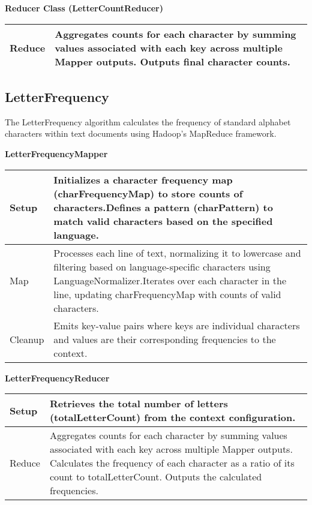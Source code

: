 \textbf{Reducer Class (LetterCountReducer)}
\begin{longtable}{|>{\raggedright\arraybackslash}p{}|>{\raggedright\arraybackslash}p{}|}
    \hline
    Reduce & Aggregates counts for each character by summing values associated with each key across multiple Mapper outputs. Outputs final character counts. \\
    \hline
\end{longtable}






\subsection{LetterFrequency}
The LetterFrequency algorithm calculates the frequency of standard alphabet characters within text documents using Hadoop's MapReduce framework.


\textbf{LetterFrequencyMapper}
\begin{longtable}{|>{\raggedright\arraybackslash}p{}|>{\raggedright\arraybackslash}p{}|}
    \hline
    Setup & Initializes a character frequency map (charFrequencyMap) to store counts of characters.Defines a pattern (charPattern) to match valid characters based on the specified language. \\
    \hline
    Map & Processes each line of text, normalizing it to lowercase and filtering based on language-specific characters using LanguageNormalizer.Iterates over each character in the line, updating charFrequencyMap with counts of valid characters.\\
    \hline
    Cleanup & Emits key-value pairs where keys are individual characters and values are their corresponding frequencies to the context.
    \\
    \hline
\end{longtable}


\textbf{LetterFrequencyReducer}
\begin{longtable}{|>{\raggedright\arraybackslash}p{}|>{\raggedright\arraybackslash}p{}|}
    \hline
    Setup & Retrieves the total number of letters (totalLetterCount) from the context configuration. \\
    \hline
    Reduce & Aggregates counts for each character by summing values associated with each key across multiple Mapper outputs.
    Calculates the frequency of each character as a ratio of its count to totalLetterCount.
    Outputs the calculated frequencies.\\
    \hline
\end{longtable}













